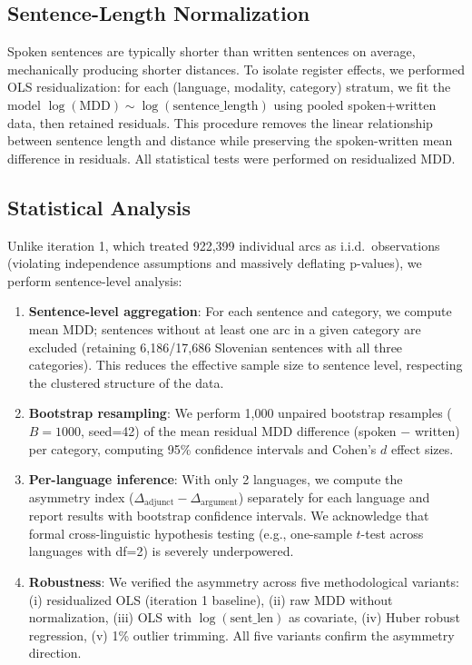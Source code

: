 \documentclass[11pt,letterpaper]{article}
\begin{document}
\subsection{Sentence-Length Normalization}

Spoken sentences are typically shorter than written sentences on average, mechanically producing shorter distances. To isolate register effects, we performed OLS residualization: for each (language, modality, category) stratum, we fit the model $\log(\text{MDD}) \sim \log(\text{sentence\_length})$ using pooled spoken+written data, then retained residuals. This procedure removes the linear relationship between sentence length and distance while preserving the spoken-written mean difference in residuals. All statistical tests were performed on residualized MDD.

\subsection{Statistical Analysis}

Unlike iteration 1, which treated 922,399 individual arcs as i.i.d.\ observations (violating independence assumptions and massively deflating p-values), we perform sentence-level analysis:

\begin{enumerate}
  \item \textbf{Sentence-level aggregation}: For each sentence and category, we compute mean MDD; sentences without at least one arc in a given category are excluded (retaining 6,186/17,686 Slovenian sentences with all three categories). This reduces the effective sample size to sentence level, respecting the clustered structure of the data.

  \item \textbf{Bootstrap resampling}: We perform 1,000 unpaired bootstrap resamples ($B=1000$, seed=42) of the mean residual MDD difference (spoken $-$ written) per category, computing 95\% confidence intervals and Cohen's $d$ effect sizes.

  \item \textbf{Per-language inference}: With only 2 languages, we compute the asymmetry index ($\Delta_\text{adjunct} - \Delta_\text{argument}$) separately for each language and report results with bootstrap confidence intervals. We acknowledge that formal cross-linguistic hypothesis testing (e.g., one-sample $t$-test across languages with df=2) is severely underpowered.

  \item \textbf{Robustness}: We verified the asymmetry across five methodological variants: (i) residualized OLS (iteration 1 baseline), (ii) raw MDD without normalization, (iii) OLS with $\log(\text{sent\_len})$ as covariate, (iv) Huber robust regression, (v) 1\% outlier trimming. All five variants confirm the asymmetry direction.
\end{enumerate}
\end{document}
